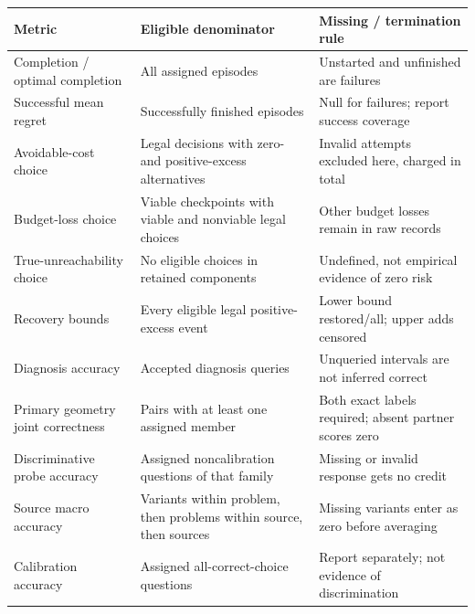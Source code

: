 \clearpage
\onecolumn
\begin{center}
\small
{}
\begin{tabular}{p{}p{}p{}}\toprule
Metric & Eligible denominator & Missing / termination rule\\\midrule
Completion / optimal completion & All assigned episodes & Unstarted and unfinished are failures\\
Successful mean regret & Successfully finished episodes & Null for failures; report success coverage\\
Avoidable-cost choice & Legal decisions with zero- and positive-excess alternatives & Invalid attempts excluded here, charged in total\\
Budget-loss choice & Viable checkpoints with viable and nonviable legal choices & Other budget losses remain in raw records\\
True-unreachability choice & No eligible choices in retained components & Undefined, not empirical evidence of zero risk\\
Recovery bounds & Every eligible legal positive-excess event & Lower bound restored/all; upper adds censored\\
Diagnosis accuracy & Accepted diagnosis queries & Unqueried intervals are not inferred correct\\
Primary geometry joint correctness & Pairs with at least one assigned member & Both exact labels required; absent partner scores zero\\
Discriminative probe accuracy & Assigned noncalibration questions of that family & Missing or invalid response gets no credit\\
Source macro accuracy & Variants within problem, then problems within source, then sources & Missing variants enter as zero before averaging\\
Calibration accuracy & Assigned all-correct-choice questions & Report separately; not evidence of discrimination\\
\bottomrule\end{tabular}
\end{center}

